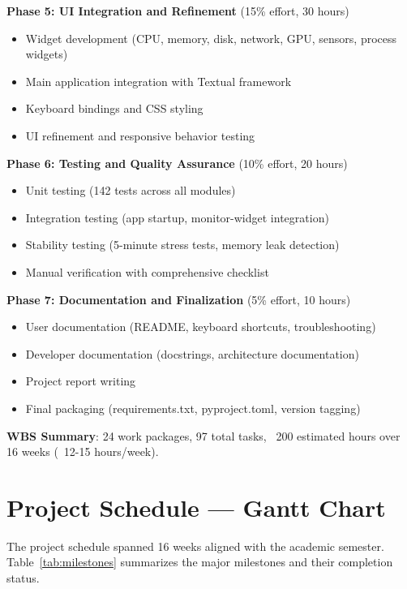 \documentclass[12pt,a4paper,oneside]{report}
\begin{document}
\textbf{Phase 5: UI Integration and Refinement} (15\% effort, 30 hours)
\begin{itemize}
    \item Widget development (CPU, memory, disk, network, GPU, sensors, process widgets)
    \item Main application integration with Textual framework
    \item Keyboard bindings and CSS styling
    \item UI refinement and responsive behavior testing
\end{itemize}

\textbf{Phase 6: Testing and Quality Assurance} (10\% effort, 20 hours)
\begin{itemize}
    \item Unit testing (142 tests across all modules)
    \item Integration testing (app startup, monitor-widget integration)
    \item Stability testing (5-minute stress tests, memory leak detection)
    \item Manual verification with comprehensive checklist
\end{itemize}

\textbf{Phase 7: Documentation and Finalization} (5\% effort, 10 hours)
\begin{itemize}
    \item User documentation (README, keyboard shortcuts, troubleshooting)
    \item Developer documentation (docstrings, architecture documentation)
    \item Project report writing
    \item Final packaging (requirements.txt, pyproject.toml, version tagging)
\end{itemize}

\textbf{WBS Summary}: 24 work packages, 97 total tasks, ~200 estimated hours over 16 weeks (~12-15 hours/week).

\section{Project Schedule --- Gantt Chart}
\label{sec:schedule}

The project schedule spanned 16 weeks aligned with the academic semester. Table~\ref{tab:milestones} summarizes the major milestones and their completion status.
\end{document}
